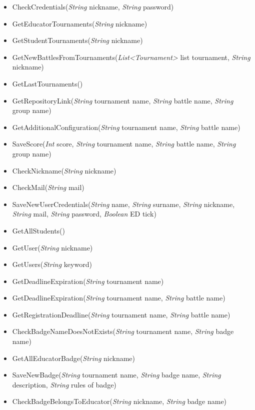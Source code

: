 \begin{itemize}
\begin{itemize}
        \item CheckCredentials(\textit{String} nickname, \textit{String} password)
        \item GetEducatorTournaments(\textit{String} nickname)
        \item GetStudentTournaments(\textit{String} nickname)
        \item GetNewBattlesFromTournaments(\textit{List\textless Tournament\textgreater} list tournament, \textit{String} nickname)
        \item GetLastTournaments()
        \item GetRepositoryLink(\textit{String} tournament name, \textit{String} battle name, \textit{String} group name)
        \item GetAdditionalConfiguration(\textit{String} tournament name, \textit{String} battle name)
        \item SaveScore(\textit{Int}  score, \textit{String} tournament name, \textit{String} battle name, \textit{String} group name)
        \item CheckNickname(\textit{String} nickname)
        \item CheckMail(\textit{String} mail)
        \item SaveNewUserCredentials(\textit{String} name, \textit{String} surname, \textit{String} nickname, \textit{String} mail, \textit{String} password, \textit{Boolean}  ED tick)
        \item GetAllStudents()
        \item GetUser(\textit{String} nickname)
        \item GetUsers(\textit{String} keyword)
        \item GetDeadlineExpiration(\textit{String} tournament name)
        \item GetDeadlineExpiration(\textit{String} tournament name, \textit{String} battle name)
        \item GetRegistrationDeadline(\textit{String} tournament name, \textit{String} battle name)
        \item CheckBadgeNameDoesNotExists(\textit{String} tournament name, \textit{String} badge name)
        \item GetAllEducatorBadge(\textit{String} nickname)
        \item SaveNewBadge(\textit{String} tournament name, \textit{String} badge name, \textit{String} description, \textit{String} rules of badge)
        \item CheckBadgeBelongsToEducator(\textit{String} nickname, \textit{String} badge name)

\end{itemize}
\end{itemize}
